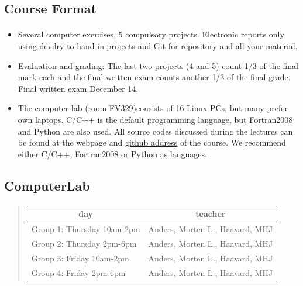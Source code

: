 \documentclass[%
oneside,                 %
final,                   %
10pt]{article}
\begin{document}
\noindent



\subsection*{Course Format}


\paragraph{}
\begin{itemize}
  \item Several computer exercises, 5 compulsory projects. Electronic reports only using \href{{https://devilry.ifi.uio.no/}}{devilry} to hand in projects and \href{{https://github.com/}}{Git} for repository and all your material.

  \item Evaluation and grading: The last two projects (4 and 5) count 1/3 of the final mark each  and the  final written exam counts another 1/3 of the final grade. Final written exam December 14.

  \item The computer lab (room FV329)consists of 16 Linux PCs, but many prefer own laptops. C/C++ is the default programming language, but Fortran2008 and Python are also used. All source codes discussed during the lectures can be found at the webpage and \href{{https://github.com/CompPhysics/ComputationalPhysics1}}{github address} of the course. We recommend either C/C++, Fortran2008 or Python as languages.
\end{itemize}

\noindent



\subsection*{ComputerLab}


\paragraph{}


\begin{quote}
\begin{tabular}{ll}
\hline
\multicolumn{1}{c}{ day } & \multicolumn{1}{c}{ teacher } \\
\hline
Group 1: Thursday 10am-2pm & Anders, Morten L., Haavard, MHJ \\
Group 2: Thursday 2pm-6pm  & Anders, Morten L., Haavard, MHJ \\
Group 3: Friday 10am-2pm   & Anders, Morten L., Haavard, MHJ \\
Group 4: Friday 2pm-6pm    & Anders, Morten L., Haavard, MHJ \\
\hline
\end{tabular}
\end{quote}
\end{document}
